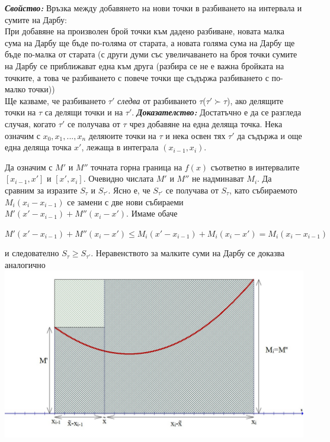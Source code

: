 \documentclass[11pt]{article} %
\newcommand{\italicBold}[1]{\textbf{\emph{#1}}}
\newcommand{\proof}{\italicBold{Доказателство: }}
\begin{document}
\italicBold{Свойство: } Връзка между добавянето на нови точки в разбиването на интервала и сумите на Дарбу:\\
При добавяне на произволен брой точки към дадено разбиване, новата малка сума на Дарбу ще бъде по-голяма от старата, а новата голяма сума на Дарбу ще бъде по-малка от старата (с други думи със увеличаването на броя точки сумите на Дарбу се приближават една към друга (разбира се не е важна бройката на точките, а това че разбиването с повече точки ще съдържа разбиването с по-малко точки))\\
Ще казваме, че разбиването $\tau'$ \textit{следва} от разбиването $\tau$($\tau' \succ \tau$), ако делящите точки на $\tau$ са делящи точки и на $\tau'$.
\proof Достатъчно е да се разгледа случая, когато $\tau'$ се получава от $\tau$ чрез добавяне на една деляща точка. Нека означим с $x_{0}, x_{1},...,x_{n}$ деляюите точки на $\tau$ и нека освен тях $\tau'$ да съдържа и още една деляща точка $x'$, лежаща в интеграла $(x_{i-1},x_{i})$.\par

Да означим с $M'$ и $M''$ точната горна граница на $f(x)$ съответно в интервалите $[x_{i-1}, x']$ и $[x', x_{i}]$. Очевидно числата $M'$ и $M''$ не надминават $M_{i}$. Да сравним за изразите $S_{\tau}$ и $S_{\tau'}$. Ясно е, че $S_{\tau'}$ се получава от $S_{\tau}$, като събираемото $M_{i}(x_{i}-x_{i-1})$ се замени с две нови събираеми $M'(x'-x_{i-1})+M''(x_{i}-x')$. Имаме обаче\\
\centerline{$M'(x'-x_{i-1})+M''(x_{i}-x')\leq M_{i}(x'-x_{i-1})+M_{i}(x_{i}-x')=M_{i}(x_{i}-x_{i-1})$}
и следователно $S_{\tau} \geq S_{\tau'}$. Неравенството за малките суми на Дарбу се доказва аналогично\\
\includegraphics[scale=0.35]{Darbu.jpg}\\\par 
\end{document}

